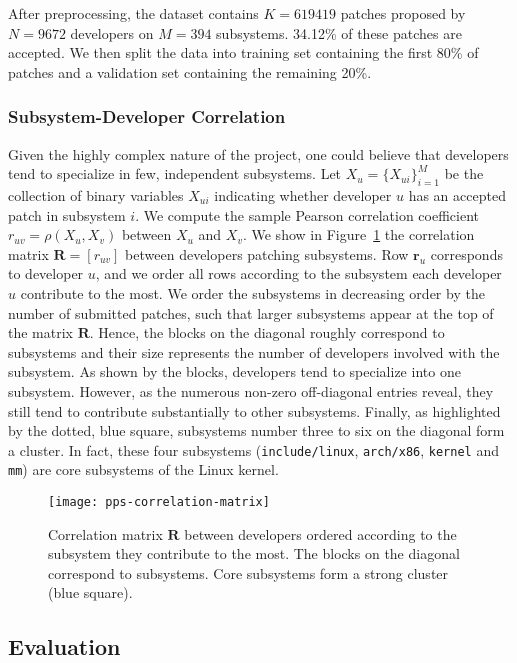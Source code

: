 After preprocessing, the dataset contains $K= \num{619419}$ patches proposed by $ N = \num{9672} $ developers on $M = \num{394}$ subsystems.
34.12\% of these patches are accepted.
We then split the data into training set containing the first 80\% of patches and a validation set containing the remaining 20\%.

\subsubsection{Subsystem-Developer Correlation}

Given the highly complex nature of the project, one could believe that developers tend to specialize in few, independent subsystems.
Let $X_u = \{ X_{ui} \}_{i=1}^M$ be the collection of binary variables $ X_{ui} $ indicating whether developer $u$ has an accepted patch in subsystem $i$.
We compute the sample Pearson correlation coefficient $r_{uv} = \rho(X_u, X_v)$ between $X_u$ and $X_v$.
We show in Figure~\ref{pps:fig:linux_correlation} the correlation matrix $ \bm{R} = [r_{uv}] $ between developers patching subsystems.
Row $\bm{r}_u$ corresponds to developer $u$, and we order all rows according to the subsystem each developer $u$ contribute to the most.
We order the subsystems in decreasing order by the number of submitted patches, such that larger subsystems appear at the top of the matrix $\bm{R}$.
Hence, the blocks on the diagonal roughly correspond to subsystems and their size represents the number of developers involved with the subsystem.
As shown by the blocks, developers tend to specialize into one subsystem.
However, as the numerous non-zero off-diagonal entries reveal, they still tend to contribute substantially to other subsystems.
Finally, as highlighted by the dotted, blue square, subsystems number three to six on the diagonal form a cluster.
In fact, these four subsystems (\texttt{include/linux}, \texttt{arch/x86}, \texttt{kernel} and \texttt{mm}) are core subsystems of the Linux kernel.

\begin{figure}
	\texttt{[image: pps-correlation-matrix]}
	\caption{Correlation matrix $ \bm{R} $ between developers ordered according to the subsystem they contribute to the most. The blocks on the diagonal correspond to subsystems.
		Core subsystems form a strong cluster (blue square).}
	\label{pps:fig:linux_correlation}
\end{figure}

\subsection{Evaluation}

